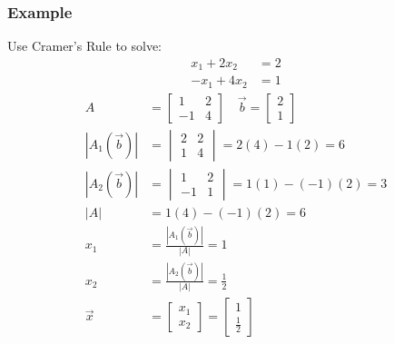 \documentclass[letterpaper, 12pt]{math}
\begin{document}
\subsubsection*{Example}
Use Cramer's Rule to solve:
\begin{align*}
  x_1+2x_2 &= 2 \\
  -x_1+4x_2 &= 1
\end{align*}
\begin{align*}
  A &= \begin{bmatrix}
    1 & 2 \\
    -1 & 4
  \end{bmatrix} \quad \vec{b} = \begin{bmatrix}2 \\ 1\end{bmatrix} \\
  |A_1(\vec{b})| &= \begin{vmatrix}
    2 & 2 \\
    1 & 4
  \end{vmatrix} = 2(4)-1(2) = 6 \\
  |A_2(\vec{b})| &= \begin{vmatrix}
    1 & 2 \\
    -1 & 1
  \end{vmatrix} = 1(1)-(-1)(2) = 3 \\
  |A| &= 1(4)-(-1)(2) = 6 \\
  x_1 &= \frac{|A_1(\vec{b})|}{|A|} = 1 \\
  x_2 &= \frac{|A_2(\vec{b})|}{|A|} = \frac{1}{2} \\
  \vec{x} &= \begin{bmatrix}
    x_1 \\ x_2
  \end{bmatrix} = \begin{bmatrix}
    1 \\ \frac{1}{2}
  \end{bmatrix}
\end{align*}
\end{document}
